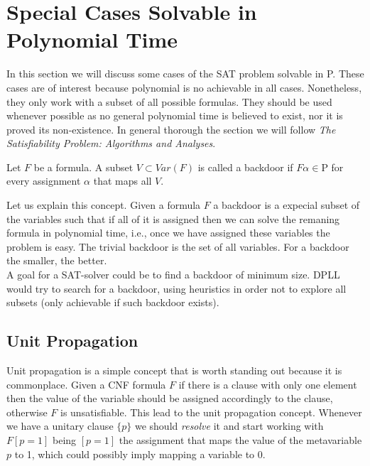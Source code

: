 
\section{Special Cases Solvable in Polynomial Time}

In this section we will discuss some cases of the SAT problem solvable in P. These cases are of interest because polynomial is no achievable in all cases. Nonetheless, they only work with a subset of all possible formulas. They should be used whenever possible as no general polynomial time is believed to exist, nor it is proved its non-existence. In general thorough the section we will follow \emph{The Satisfiability Problem: Algorithms and Analyses}\cite{schoning2013satisfiability}.

\begin{definition}
  Let $F$ be a formula. A subset $ V \subset Var(F)$ is called a backdoor if $F\alpha \in \text{P}$ for every assignment $\alpha$ that maps all $V$.
\end{definition}

Let us explain this concept. Given a formula $F$ a backdoor is a expecial subset of the variables such that if all of it is assigned then we can solve the remaning formula in polynomial time, i.e., once we have assigned these variables the problem is easy. The trivial backdoor is the set of all variables. For a backdoor the smaller, the better.\\


A goal for a SAT-solver could be to find a backdoor of minimum size. DPLL would try to search for a backdoor, using heuristics in order not to explore all subsets (only achievable if such backdoor exists).

\subsection{Unit Propagation}

Unit propagation is a simple concept that is worth standing out because it is commonplace. Given a CNF formula $F$ if there is a clause with only one element then the value of the variable should be assigned accordingly to the clause, otherwise $F$ is unsatisfiable. This lead to the unit propagation concept. Whenever we have a unitary clause $\{p\}$ we should \emph{resolve} it and start working with $F[p=1]$ being $[p=1]$ the assignment that maps the value of the metavariable $p$ to 1, which could possibly imply mapping a variable to $0$.  \\

